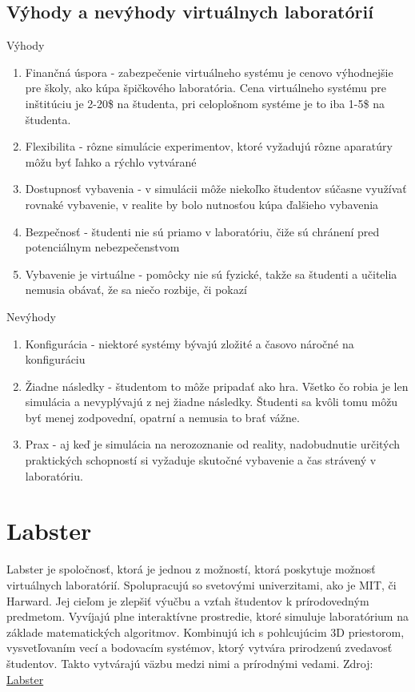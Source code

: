\documentclass[10pt,oneside,slovak,a4paper]{article}
\begin{document}
\subsection {Výhody a nevýhody virtuálnych laboratórií} \label{vyhody_nevyhody}
 Výhody
\begin{enumerate}
\item Finančná úspora - zabezpečenie virtuálneho systému je cenovo výhodnejšie pre školy, ako kúpa špičkového laboratória. Cena virtuálneho systému pre inštitúciu je 2-20\$ na študenta, pri celoplošnom systéme je to iba 1-5\$ na študenta.\cite{potkonjak2016virtual}
\item Flexibilita - rôzne simulácie experimentov, ktoré vyžadujú rôzne aparatúry môžu byť ľahko a rýchlo vytvárané\cite{potkonjak2016virtual}

\item Dostupnosť vybavenia - v simulácii môže niekoľko študentov súčasne využívať rovnaké vybavenie, v realite by bolo nutnosťou kúpa ďalšieho vybavenia \cite{potkonjak2016virtual}

\item Bezpečnosť - študenti nie sú priamo v laboratóriu, čiže sú chránení pred potenciálnym nebezpečenstvom\cite{potkonjak2016virtual}
\item Vybavenie je virtuálne - pomôcky nie sú fyzické, takže sa študenti a učitelia nemusia obávať, že sa niečo rozbije, či pokazí\cite{potkonjak2016virtual}

\end{enumerate}
Nevýhody
\begin{enumerate}
    \item Konfigurácia - niektoré systémy bývajú zložité a časovo náročné na konfiguráciu\cite{potkonjak2016virtual}
    
    \item Žiadne následky - študentom to môže pripadať ako hra. Všetko čo robia je len simulácia a nevyplývajú z nej žiadne následky. Študenti sa kvôli tomu môžu byť menej zodpovední, opatrní a nemusia to brať vážne.\cite{potkonjak2016virtual}
    
    \item Prax - aj keď je simulácia na nerozoznanie od reality, nadobudnutie určitých praktických schopností si vyžaduje skutočné vybavenie a čas strávený v laboratóriu.\cite{potkonjak2016virtual}
    
\end{enumerate}


\section{Labster}\label{labster}
Labster je spoločnosť, ktorá je jednou z možností, ktorá poskytuje možnosť virtuálnych laboratórií. Spolupracujú so svetovými univerzitami, ako je MIT, či Harward. Jej cieľom je zlepšiť výučbu a vzťah študentov k prírodovedným predmetom. Vyvíjajú plne interaktívne prostredie, ktoré simuluje laboratórium na základe matematických algoritmov. Kombinujú ich s pohlcujúcim 3D priestorom, vysvetľovaním vecí a bodovacím systémov, ktorý vytvára prirodzenú zvedavosť študentov. Takto vytvárajú väzbu medzi nimi a prírodnými vedami. Zdroj: \href{https://www.labster.com/about/}{Labster}
\end{document}
